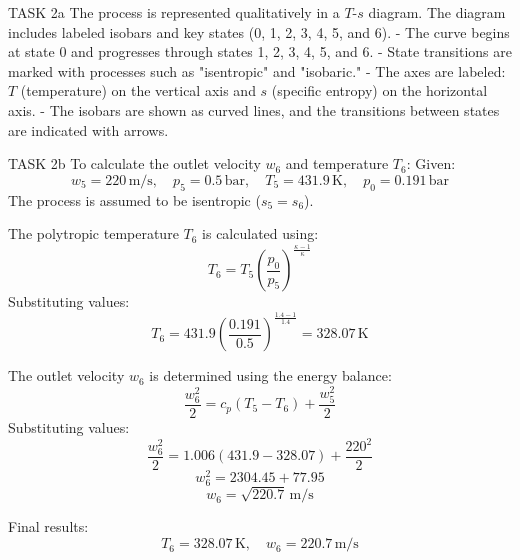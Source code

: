 TASK 2a  
The process is represented qualitatively in a \( T \)-\( s \) diagram. The diagram includes labeled isobars and key states (0, 1, 2, 3, 4, 5, and 6).  
- The curve begins at state 0 and progresses through states 1, 2, 3, 4, 5, and 6.  
- State transitions are marked with processes such as "isentropic" and "isobaric."  
- The axes are labeled: \( T \) (temperature) on the vertical axis and \( s \) (specific entropy) on the horizontal axis.  
- The isobars are shown as curved lines, and the transitions between states are indicated with arrows.  

TASK 2b  
To calculate the outlet velocity \( w_6 \) and temperature \( T_6 \):  
Given:  
\[
w_5 = 220 \, \text{m/s}, \quad p_5 = 0.5 \, \text{bar}, \quad T_5 = 431.9 \, \text{K}, \quad p_0 = 0.191 \, \text{bar}
\]  
The process is assumed to be isentropic (\( s_5 = s_6 \)).  

The polytropic temperature \( T_6 \) is calculated using:  
\[
T_6 = T_5 \left( \frac{p_0}{p_5} \right)^{\frac{\kappa - 1}{\kappa}}
\]  
Substituting values:  
\[
T_6 = 431.9 \left( \frac{0.191}{0.5} \right)^{\frac{1.4 - 1}{1.4}} = 328.07 \, \text{K}
\]  

The outlet velocity \( w_6 \) is determined using the energy balance:  
\[
\frac{w_6^2}{2} = c_p (T_5 - T_6) + \frac{w_5^2}{2}
\]  
Substituting values:  
\[
\frac{w_6^2}{2} = 1.006 (431.9 - 328.07) + \frac{220^2}{2}
\]  
\[
w_6^2 = 2304.45 + 77.95
\]  
\[
w_6 = \sqrt{220.7} \, \text{m/s}
\]  

Final results:  
\[
T_6 = 328.07 \, \text{K}, \quad w_6 = 220.7 \, \text{m/s}
\]
